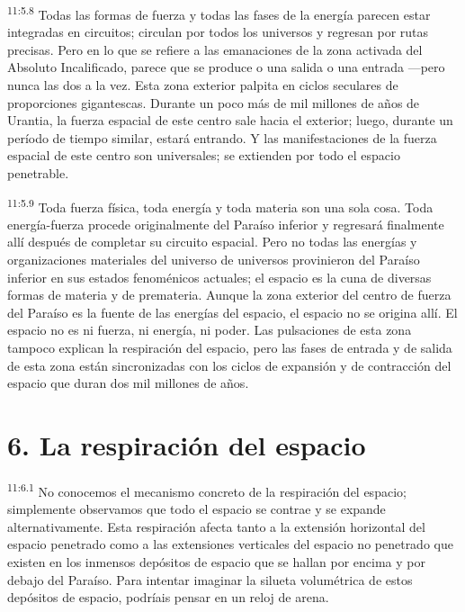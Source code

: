 \par
\textsuperscript{11:5.8} Todas las formas de fuerza y todas las fases de la energía parecen estar integradas en circuitos; circulan por todos los universos y regresan por rutas precisas. Pero en lo que se refiere a las emanaciones de la zona activada del Absoluto Incalificado, parece que se produce o una salida o una entrada ---pero nunca las dos a la vez. Esta zona exterior palpita en ciclos seculares de proporciones gigantescas. Durante un poco más de mil millones de años de Urantia, la fuerza espacial de este centro sale hacia el exterior; luego, durante un período de tiempo similar, estará entrando. Y las manifestaciones de la fuerza espacial de este centro son universales; se extienden por todo el espacio penetrable.

\par
\textsuperscript{11:5.9} Toda fuerza física, toda energía y toda materia son una sola cosa. Toda energía-fuerza procede originalmente del Paraíso inferior y regresará finalmente allí después de completar su circuito espacial. Pero no todas las energías y organizaciones materiales del universo de universos provinieron del Paraíso inferior en sus estados fenoménicos actuales; el espacio es la cuna de diversas formas de materia y de premateria. Aunque la zona exterior del centro de fuerza del Paraíso es la fuente de las energías del espacio, el espacio no se origina allí. El espacio no es ni fuerza, ni energía, ni poder. Las pulsaciones de esta zona tampoco explican la respiración del espacio, pero las fases de entrada y de salida de esta zona están sincronizadas con los ciclos de expansión y de contracción del espacio que duran dos mil millones de años.

\section*{6. La respiración del espacio}
\par
\textsuperscript{11:6.1} No conocemos el mecanismo concreto de la respiración del espacio; simplemente observamos que todo el espacio se contrae y se expande alternativamente. Esta respiración afecta tanto a la extensión horizontal del espacio penetrado como a las extensiones verticales del espacio no penetrado que existen en los inmensos depósitos de espacio que se hallan por encima y por debajo del Paraíso. Para intentar imaginar la silueta volumétrica de estos depósitos de espacio, podríais pensar en un reloj de arena.

